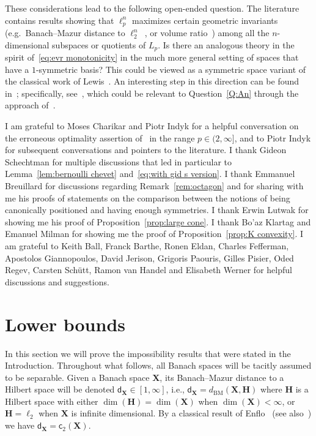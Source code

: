 \documentclass[11pt,reqno]{amsart}
\newcommand{\cc}{\mathsf{c}}
\newcommand{\dd}{\mathsf{d}}
\newcommand{\X}{\mathbf X}
\theoremstyle{remark}
\newcommand{\BM}{\mathrm{BM}}
\renewcommand{\1}{\mathbf 1}
\begin{document}
These considerations lead to the following open-ended question. The literature contains results showing that $\ell_p^n$ maximizes certain geometric invariants (e.g.~Banach--Mazur distance to $\ell_2^n$~\cite{Lew78}, or volume ratio~\cite{Bal91-reverse}) among all  the $n$-dimensional subspaces or quotients of $L_p$. Is there an  analogous theory in the spirit of~\eqref{eq:evr monotonicity} in the much more general setting of spaces that have a $1$-symmetric basis? This could be viewed as a symmetric space variant of the classical work of Lewis~\cite{Lew78,Lew79}. An interesting step in this direction can be found in~\cite{Tom80}; specifically, see~\cite[Theorem~1.2]{Tom80}, which could be relevant to Question~\ref{Q:An} through the approach of~\cite[Section~2]{Bal91-reverse}.








 I am grateful to Moses Charikar and Piotr Indyk for a helpful conversation on the erroneous optimality assertion of~\cite{CCGGP98} in the range $p\in (2,\infty]$, and to Piotr Indyk for  subsequent conversations and pointers to the literature.  I thank Gideon Schechtman for multiple discussions that led in particular to Lemma~\ref{lem:bernoulli chevet} and~\eqref{eq:with gid s version}.   I thank Emmanuel Breuillard for discussions regarding Remark~\ref{rem:octagon} and for sharing with me his  proofs of statements on the comparison between the notions of being canonically positioned and having enough symmetries. I thank Erwin Lutwak for showing me his proof of Proposition~\ref{prop:large cone}. I thank Bo'az Klartag and Emanuel Milman for showing me the proof of Proposition~\ref{prop:K convexity}.
 I am grateful to Keith Ball, Franck Barthe, Ronen Eldan, Charles Fefferman, Apostolos Giannopoulos, David Jerison, Grigoris Paouris, Gilles Pisier, Oded Regev, Carsten Sch\"utt, Ramon van Handel and Elisabeth Werner for helpful discussions and suggestions.





\section{Lower bounds}\label{sec:lower}

In this section we will prove the  impossibility results that were stated in the Introduction. Throughout what follows, all Banach spaces will be tacitly assumed to be separable. Given a  Banach space $\X$, its Banach--Mazur distance to a Hilbert space will be denoted $\dd_{\X}\in [1,\infty]$, i.e., $\dd_{\X}=d_{\BM}(\X,\mathbf{H})$ where $\mathbf{H}$ is a Hilbert space with either $\dim(\mathbf{H})=\dim(\X)$ when $\dim(\X)<\infty$, or $\mathbf{H}=\ell_2$ when $\X$ is infinite dimensional. By a classical result of Enflo~\cite[Theorem~6.3.3]{Enf70} (see also~\cite[Corollary~7.10]{BL00}) we have $\dd_{\X}=\cc_2(\X)$.
\end{document}
